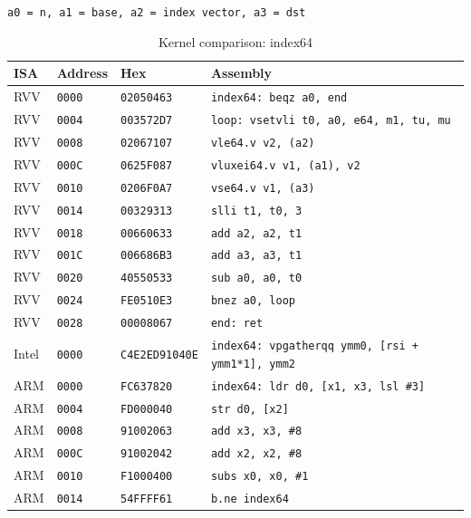 \begin{table}[htbp]
\centering
\caption{Kernel comparison: index64}
\begingroup
\scriptsize
\setlength{\tabcolsep}{4pt}
\noindent \texttt{a0 = n, a1 = base, a2 = index vector, a3 = dst}\par
\vspace{0.6ex}
\begin{tabular}{@{}l|l|l|p{7.2cm}@{}}
\toprule
ISA & Address & Hex & Assembly \\
\midrule
RVV & \texttt{0000} & \texttt{02050463} & \texttt{index64: beqz a0, end} \\
RVV & \texttt{0004} & \texttt{003572D7} & \texttt{loop: vsetvli t0, a0, e64, m1, tu, mu} \\
RVV & \texttt{0008} & \texttt{02067107} & \texttt{vle64.v v2, (a2)} \\
RVV & \texttt{000C} & \texttt{0625F087} & \texttt{vluxei64.v v1, (a1), v2} \\
RVV & \texttt{0010} & \texttt{0206F0A7} & \texttt{vse64.v v1, (a3)} \\
RVV & \texttt{0014} & \texttt{00329313} & \texttt{slli t1, t0, 3} \\
RVV & \texttt{0018} & \texttt{00660633} & \texttt{add a2, a2, t1} \\
RVV & \texttt{001C} & \texttt{006686B3} & \texttt{add a3, a3, t1} \\
RVV & \texttt{0020} & \texttt{40550533} & \texttt{sub a0, a0, t0} \\
RVV & \texttt{0024} & \texttt{FE0510E3} & \texttt{bnez a0, loop} \\
RVV & \texttt{0028} & \texttt{00008067} & \texttt{end: ret} \\
\midrule
Intel & \texttt{0000} & \texttt{C4E2ED91040E} & \texttt{index64: vpgatherqq ymm0, [rsi + ymm1*1], ymm2} \\
\midrule
ARM & \texttt{0000} & \texttt{FC637820} & \texttt{index64: ldr d0, [x1, x3, lsl \#3]} \\
ARM & \texttt{0004} & \texttt{FD000040} & \texttt{str d0, [x2]} \\
ARM & \texttt{0008} & \texttt{91002063} & \texttt{add x3, x3, \#8} \\
ARM & \texttt{000C} & \texttt{91002042} & \texttt{add x2, x2, \#8} \\
ARM & \texttt{0010} & \texttt{F1000400} & \texttt{subs x0, x0, \#1} \\
ARM & \texttt{0014} & \texttt{54FFFF61} & \texttt{b.ne index64} \\
\bottomrule
\end{tabular}
\endgroup
\end{table}
\noindent{}\par
